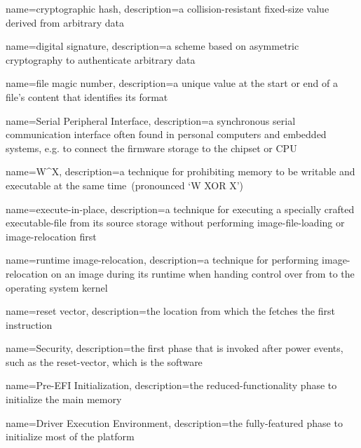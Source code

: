 {
  name={cryptographic hash},
  description={a collision-resistant fixed-size value derived from arbitrary data}
}

{
  name={digital signature},
  description={a scheme based on asymmetric cryptography to authenticate arbitrary data}
}

{
  name={file magic number},
  description={a unique value at the start or end of a file's content that identifies its format}
}

{
  name={Serial Peripheral Interface},
  description={a synchronous serial communication interface often found in personal computers and embedded systems, e.g. to connect the \gls{firmware} storage to the chipset or \gls{CPU}}
}

{
  name={W\^{}X},
  description={a technique for prohibiting memory to be writable and executable at the same time~(pronounced `W XOR X')}
}

{
  name={execute-in-place},
  description={a technique for executing a specially crafted \gls{executable-file} from its source storage without performing \gls{image-file-loading} or \gls{image-relocation} first}
}

{
  name={runtime \gls{image-relocation}},
  description={a technique for performing \gls{image-relocation} on an \gls{image} during its runtime when handing control over from  to the operating system kernel}
}

{
  name={reset vector},
  description={the location from which the  fetches the first instruction}
}

{
  name={Security},
  description={the first  phase that is invoked after power events, such as the \gls{reset-vector}, which is the software }
}

{
  name={Pre-EFI Initialization},
  description={the reduced-functionality  phase to initialize the main memory}
}

{
  name={Driver Execution Environment},
  description={the fully-featured  phase to initialize most of the platform}
}

